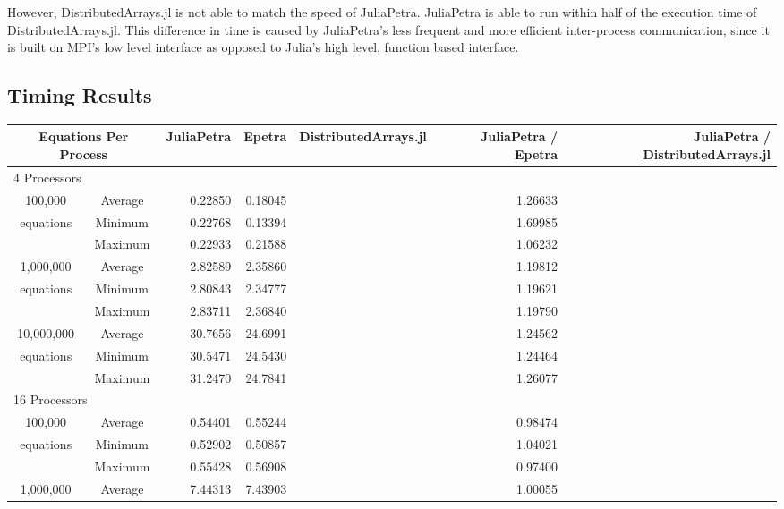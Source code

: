 \documentclass[acmsmall]{acmart}
\begin{document}
However, DistributedArrays.jl is not able to match the speed of JuliaPetra.
JuliaPetra is able to run within half of the execution time of DistributedArrays.jl.
This difference in time is caused by JuliaPetra's less frequent and more efficient inter-process communication,
since it is built on MPI's low level interface as opposed to Julia's high level, function based interface.

\subsection{Timing Results}

\begin{table}
	\begin{tabular}{|c c|r|r|r||r|r|}
		\hline
			\multicolumn{2}{|c|}{Equations Per Process}
			& JuliaPetra
			& Epetra
			& \multicolumn{1}{m{1.8cm}||}{Distributed\-Arrays.jl}
			& \multicolumn{1}{m{1.75cm}|}{JuliaPetra / Epetra}
			& \multicolumn{1}{m{1.8cm}|}{JuliaPetra / Distributed\-Arrays.jl} \\
		\hline
			\multicolumn{7}{|l|}{4 Processors}\\
		\hline
			100,000			&Average & 0.22850 & 0.18045 &  & 1.26633 &  \\
			equations		&Minimum & 0.22768 & 0.13394 &  & 1.69985 &  \\
							&Maximum & 0.22933 & 0.21588 &  & 1.06232 &  \\
		\hline
			1,000,000		&Average & 2.82589 & 2.35860 &  & 1.19812 &  \\
			equations		&Minimum & 2.80843 & 2.34777 &  & 1.19621 &  \\
							&Maximum & 2.83711 & 2.36840 &  & 1.19790 &  \\
		\hline
			10,000,000		&Average & 30.7656 & 24.6991 &  & 1.24562 &  \\
			equations		&Minimum & 30.5471 & 24.5430 &  & 1.24464 &  \\
							&Maximum & 31.2470 & 24.7841 &  & 1.26077 &  \\
		\hline
			\multicolumn{7}{|l|}{16 Processors}\\
		\hline
			100,000			&Average & 0.54401 & 0.55244 &  & 0.98474 &  \\
			equations		&Minimum & 0.52902 & 0.50857 &  & 1.04021 &  \\
							&Maximum & 0.55428 & 0.56908 &  & 0.97400 &  \\
		\hline
			1,000,000		&Average & 7.44313 & 7.43903 &  & 1.00055 &  \\

\end{tabular}
\end{table}
\end{document}
